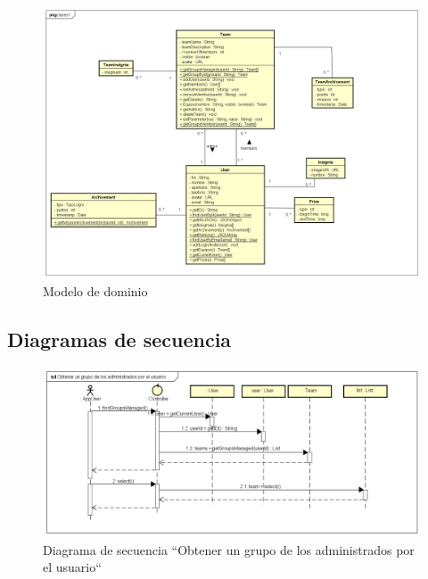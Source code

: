 \documentclass[twoside]{report}
\begin{document}
\begin{figure}[H]
\begin{center}
\includegraphics[scale=0.4]{images/clases.png}
\caption{Modelo de dominio}
\end{center}
\end{figure}

\subsection{Diagramas de secuencia}

\begin{figure}[H]
\includegraphics[scale=0.5]{images/sequence/GetAGroupManagedByUser.png}
\caption{Diagrama de secuencia “Obtener un grupo de los administrados por el usuario“}
\end{figure}
\end{document}
